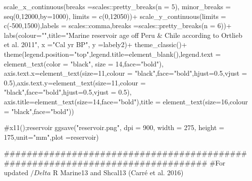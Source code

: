 \documentclass[
]{article}
\newenvironment{Shaded}{\begin{snugshade}}{\end{snugshade}}
\newcommand{\NormalTok}[1]{#1}
\begin{document}
\begin{Shaded}
\begin{Highlighting}[]
\NormalTok{  scale\_x\_continuous(breaks =scales::pretty\_breaks(n = 5),}
\NormalTok{                   minor\_breaks = seq(0,12000,by=1000),}
\NormalTok{                   limits = c(0,12050))+}
\NormalTok{  scale\_y\_continuous(limits = c({-}500,1500),labels = scales::comma,breaks =scales::pretty\_breaks(n = 6))+}
\NormalTok{  labs(colour="",title="Marine reservoir age off Peru \& Chile according to Ortlieb et al. 2011",}
\NormalTok{     x ="Cal yr BP", }
\NormalTok{     y =labely2)+}
\NormalTok{  theme\_classic()+}
\NormalTok{  theme(legend.position="top",legend.title=element\_blank(),legend.text = element\_text(color = "black", size = 14,face="bold"),}
\NormalTok{        axis.text.x=element\_text(size=11,colour = "black",face="bold",hjust=0.5,vjust = 0.5),axis.text.y=element\_text(size=11,colour = "black",face="bold",hjust=0.5,vjust = 0.5),}
\NormalTok{        axis.title=element\_text(size=14,face="bold"),title = element\_text(size=16,colour = "black",face="bold"))}

\NormalTok{\#x11();reservoir}
\NormalTok{ggsave("reservoir.png", dpi = 900,   width = 275,}
\NormalTok{       height = 175,unit="mm",plot =reservoir)}

\NormalTok{\#\#\#\#\#\#\#\#\#\#\#\#\#\#\#\#\#\#\#\#\#\#\#\#\#\#\#\#\#\#\#\#\#\#\#\#\#\#\#\#\#\#\#\#\#\#\#\#\#\#\#\#\#\#\#\#\#\#\#\#\#\#\#\#\#\#\#\#\#\#\#\#\#\#\#\#\#\#\#}
\NormalTok{\#For updated $/Delta$ R Marine13 and Shcal13 (Carré et al. 2016)}


\end{Highlighting}
\end{Shaded}
\end{document}
